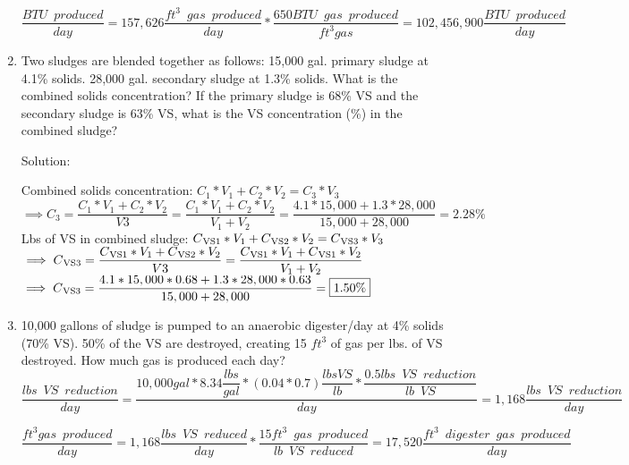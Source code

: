 \begin{enumerate}
$
	\dfrac 
	{
	BTU \enspace produced
	}
	{
	day
	}
	=
	157,626 \dfrac
			{
			ft^3 \enspace gas \enspace produced
			}
			{
			day
			}
			*
		\dfrac
		{
		650 BTU \enspace gas \enspace produced
		}
		{
		ft^3 gas
		}
		=\boxed{102,456,900 \dfrac
				{
				BTU \enspace produced
				}
				{
				day
				}}
$

\item Two sludges are blended together as follows: 15,000 gal. primary sludge at 4.1\% solids. 28,000 gal. secondary sludge at 1.3\% solids. What is the combined solids concentration?  If the primary sludge is 68\% VS and the secondary sludge is 63\% VS, what is the VS concentration (\%) in the combined sludge?

Solution:

Combined solids concentration:
$
C_1*V_1 + C_2*V_2 = C_3*V_3$\\
$\implies C_3 = \dfrac{C_1*V_1 + C_2*V_2}{V3}=\dfrac{C_1*V_1 + C_2*V_2}{V_1 + V_2}=\dfrac{4.1*15,000 + 1.3*28,000}{15,000 + 28,000}=\boxed{2.28\%}
$\\
Lbs of VS in combined sludge:
$
C\textsubscript{VS1}*V_1 + C\textsubscript{VS2}*V_2 = C\textsubscript{VS3}*V_3$\\
$\implies C\textsubscript{VS3} = \dfrac{C\textsubscript{VS1}*V_1 + C\textsubscript{VS2}*V_2}{V3}=\dfrac{C\textsubscript{VS1}*V_1 + C\textsubscript{VS1}*V_2}{V_1 + V_2}$\\
$\implies C\textsubscript{VS3}
=\dfrac{4.1*15,000*0.68 + 1.3*28,000*0.63}{15,000 + 28,000}=\boxed{1.50\%}$
\\

\pagebreak
	
\item 10,000 gallons of sludge is pumped to an anaerobic digester/day at 4\% solids (70\% VS).  50\% of the VS are destroyed, creating 15 $ft^3$ of gas per lbs. of VS destroyed. How much gas is produced each day?\\

{
$
	\dfrac
	{
	lbs \enspace VS \enspace reduction
	}
	{
	day
	}
	=
	\dfrac
	{
	10,000 gal * 8.34 \dfrac{lbs}{gal}*(0.04*0.7) \dfrac{lbs VS}{lb}*\dfrac{0.5 lbs \enspace VS \enspace  reduction}{lb \enspace VS}
	}
	{
	day
	}
 	=1,168
	\dfrac
	{
	lbs \enspace VS \enspace reduction
	}
	{
	day 
	}
$
}\\
\vspace{3mm}

{
$
	\dfrac 
	{
	ft^3 gas \enspace produced
	}
	{
	day
	}
	=
	1,168 \dfrac
			{
			lbs \enspace VS \enspace reduced
			}
			{
			day
			}
			*
		\dfrac
		{
		15 ft^3 \enspace gas \enspace produced
		}
		{
		lb \enspace VS \enspace reduced
		}
		=17,520 \dfrac
				{
				ft^3 \enspace digester \enspace 					gas \enspace produced
				}
				{
				day
				}
$
} 


\end{enumerate}
